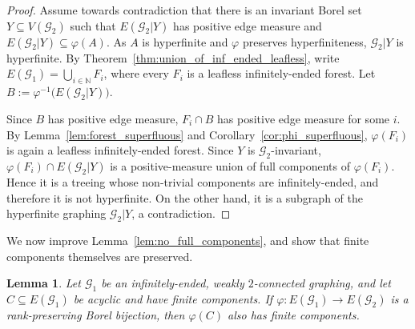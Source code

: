 \documentclass{article}
\theoremstyle{plain}
\newtheorem{lem}[thm]{Lemma}
\theoremstyle{definition}
\newcommand{\N}{\mathbb{N}}
\newcommand{\cG}{\mathcal{G}}
\newcommand{\fg}{\varphi}
\begin{document}
\begin{proof}
Assume towards contradiction that there is an invariant Borel set $Y\subseteq V(\cG_2)$ such that $E(\cG_2|Y)$ has positive edge measure and
\(        E(\cG_2|Y)\subseteq \varphi(A).
   \)
As $A$ is hyperfinite and $\varphi$ preserves hyperfiniteness, $\cG_2|Y$ is hyperfinite. By Theorem~\ref{thm:union_of_inf_ended_leafless}, write $E(\cG_1)=\bigcup_{i\in\N} F_i$,
where every $F_i$ is a leafless infinitely-ended forest. Let $    B:=\varphi^{-1}\bigl(E(\cG_2|Y)\bigr)$.

Since $B$ has positive edge measure, $F_i\cap B$ has positive edge measure for some $i$. By Lemma~\ref{lem:forest_superfluous} and Corollary~\ref{cor:phi_superfluous}, $\varphi(F_i)$ is again a leafless infinitely-ended forest. Since $Y$ is $\cG_2$-invariant, $\varphi(F_i)\cap E(\cG_2|Y)$ 
is a positive-measure union of full components of $\varphi(F_i)$. Hence it is a treeing whose non-trivial components are infinitely-ended, and therefore it is not hyperfinite. On the other hand, it is a subgraph of the hyperfinite graphing $\cG_2|Y$, a contradiction.
\end{proof}



We now improve Lemma~\ref{lem:no_full_components}, and show that finite components themselves are preserved.

\begin{lem} \label{lem:image_of_finite_is_finite}
Let $\cG_1$ be an infinitely-ended, weakly $2$-connected graphing, and let $C\subseteq E(\cG_1)$ be acyclic and have finite components. If $\fg:E(\cG_1)\to E(\cG_2)$ is a rank-preserving Borel bijection, then $\fg(C)$ also has finite components.
\end{lem}
\end{document}
